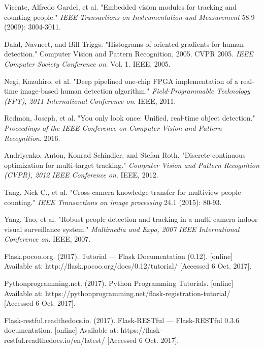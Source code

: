 \documentclass[12pt,a4paper]{report}
\begin{document}
\newpage
\begin{thebibliography}{10}

Vicente, Alfredo Gardel, et al. "Embedded vision modules for tracking and counting people." \textit{IEEE Transactions on Instrumentation and Measurement} 58.9 (2009): 3004-3011.

Dalal, Navneet, and Bill Triggs. "Histograms of oriented gradients for human detection." Computer Vision and Pattern Recognition, 2005. CVPR 2005. \textit{IEEE Computer Society Conference on}. Vol. 1. IEEE, 2005.

Negi, Kazuhiro, et al. "Deep pipelined one-chip FPGA implementation of a real-time image-based human detection algorithm." \textit{Field-Programmable Technology (FPT), 2011 International Conference on}. IEEE, 2011.

Redmon, Joseph, et al. "You only look once: Unified, real-time object detection." \textit{Proceedings of the IEEE Conference on Computer Vision and Pattern Recognition}. 2016.

Andriyenko, Anton, Konrad Schindler, and Stefan Roth. "Discrete-continuous optimization for multi-target tracking." \textit{Computer Vision and Pattern Recognition (CVPR), 2012 IEEE Conference on}. IEEE, 2012.

Tang, Nick C., et al. "Cross-camera knowledge transfer for multiview people counting." \textit{IEEE Transactions on image processing} 24.1 (2015): 80-93.

Yang, Tao, et al. "Robust people detection and tracking in a multi-camera indoor visual surveillance system." \textit{Multimedia and Expo, 2007 IEEE International Conference on}. IEEE, 2007.

Flask.pocoo.org. (2017). Tutorial — Flask Documentation (0.12). [online] Available at: http://flask.pocoo.org/docs/0.12/tutorial/ [Accessed 6 Oct. 2017].

Pythonprogramming.net. (2017). Python Programming Tutorials. [online] Available at: https://pythonprogramming.net/flask-registration-tutorial/ [Accessed 6 Oct. 2017].

Flask-restful.readthedocs.io. (2017). Flask-RESTful — Flask-RESTful 0.3.6 documentation. [online] Available at: https://flask-restful.readthedocs.io/en/latest/ [Accessed 6 Oct. 2017].
\end{thebibliography}
\end{document}
